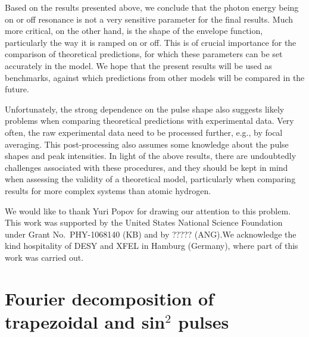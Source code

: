 \documentclass[12pt,aps,pra,amsmath,amssymb,showpacs,twocolumn,preprintnumbers,
floatfix,letterpaper]{revtex4-1}
\begin{document}
Based on the results presented above, we conclude that the photon energy being on or off resonance is not a very sensitive parameter for the final results. Much more critical, on the other hand, is the shape of the envelope function, particularly the way it is ramped on or off. This is of crucial importance for the comparison of theoretical predictions, for which these parameters can be set accurately in the model. We hope that the present results will be used as benchmarks, against which predictions from other models will be compared in the future.

Unfortunately, the strong dependence on the pulse shape also suggests likely problems when comparing theoretical predictions with experimental data. Very often, the raw experimental data need to be processed further, e.g., by focal averaging. This post-processing also assumes some knowledge about the pulse shapes and peak intensities. In light of the above results, there are undoubtedly challenges associated with these procedures, and they should be kept in mind when assessing the validity of a theoretical model, particularly when comparing results for more complex systems than atomic hydrogen.

 
\begin{acknowledgments}
We would like to thank Yuri Popov for drawing our attention to this problem. This work was supported by the United States National Science Foundation under Grant No.~PHY-1068140 (KB) and by ????? (ANG).We acknowledge the kind hospitality of DESY and XFEL in Hamburg (Germany), where part of this work was carried out.
\end{acknowledgments}

\appendix

\section{Fourier decomposition of trapezoidal and sin$^2$ pulses}
\end{document}

